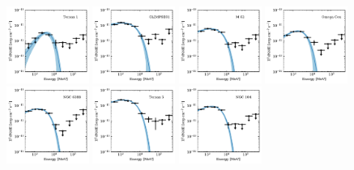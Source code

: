 \documentclass[doublespace,nopageskip]{VTthesis} %
\begin{document}
\begin{appendices}
\begin{figure}
\includegraphics[width=0.24\textwidth]{Figures/Globular/spectra/PLE_spectrum_27.pdf}
\includegraphics[width=0.24\textwidth]{Figures/Globular/spectra/PLE_spectrum_1.pdf}
\includegraphics[width=0.24\textwidth]{Figures/Globular/spectra/PLE_spectrum_11.pdf}
\includegraphics[width=0.24\textwidth]{Figures/Globular/spectra/PLE_spectrum_6.pdf}
\includegraphics[width=0.24\textwidth]{Figures/Globular/spectra/PLE_spectrum_15.pdf}
\includegraphics[width=0.24\textwidth]{Figures/Globular/spectra/PLE_spectrum_29.pdf}
\includegraphics[width=0.24\textwidth]{Figures/Globular/spectra/PLE_spectrum_3.pdf}
\end{figure}


\end{appendices}
\end{document}
